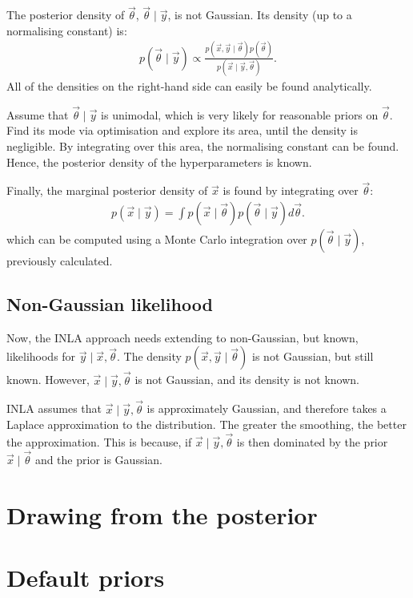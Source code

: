 \documentclass[thesis.tex]{subfiles}
\begin{document}
The posterior density of $\vec{\theta}$, $\vec{\theta }\mid \vec{y}$, is not Gaussian.
Its density (up to a normalising constant) is:
\begin{align}
p(\vec{\theta} \mid \vec{y}) \propto \frac{p(\vec{x}, \vec{y} \mid \vec{\theta}) p(\vec{\theta})}{p(\vec{x} \mid \vec{y}, \vec{\theta})}.
\end{align}
All of the densities on the right-hand side can easily be found analytically.

Assume that $\vec{\theta} \mid \vec{y}$ is unimodal, which is very likely for reasonable priors on $\vec{\theta}$.
Find its mode via optimisation and explore its area, until the density is negligible.
By integrating over this area, the normalising constant can be found.
Hence, the posterior density of the hyperparameters is known.

Finally, the marginal posterior density of $\vec{x}$ is found by integrating over $\vec{\theta}$:
\begin{align}
p(\vec{x} \mid \vec{y}) = \int p(\vec{x} \mid \vec{\theta}) p(\vec{\theta} \mid \vec{y}) d\vec{\theta}.
\end{align}
which can be computed using a Monte Carlo integration over $p(\vec{\theta} \mid \vec{y})$, previously calculated.

\subsection{Non-Gaussian likelihood}

Now, the INLA approach needs extending to non-Gaussian, but known, likelihoods for $\vec{y} \mid \vec{x}, \vec{\theta}$.
The density $p(\vec{x}, \vec{y} \mid \vec{\theta})$ is not Gaussian, but still known.
However, $\vec{x} \mid \vec{y}, \vec{\theta}$ is not Gaussian, and its density is not known.

INLA assumes that $\vec{x} \mid \vec{y}, \vec{\theta}$ is approximately Gaussian, and therefore takes a Laplace approximation to the distribution.
The greater the smoothing, the better the approximation.
This is because, if $\vec{x} \mid \vec{y}, \vec{\theta}$ is then dominated by the prior $\vec{x} \mid \vec{\theta}$ and the prior is Gaussian.


\section{Drawing from the posterior} \label{transmission:sec:INLA:posterior}

\section{Default priors} \label{transmission:sec:INLA:priors}
\end{document}
